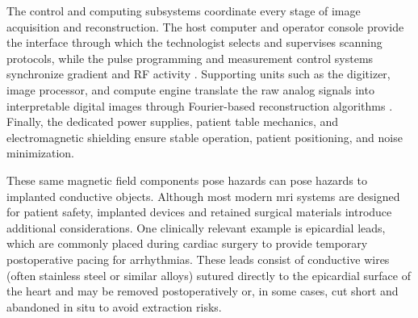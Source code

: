 The control and computing subsystems coordinate every stage of image acquisition and reconstruction. The host computer and operator console provide the interface through which the technologist selects and supervises scanning protocols, while the pulse programming and measurement control systems synchronize gradient and RF activity \cite{bushberg2011}. Supporting units such as the digitizer, image processor, and compute engine translate the raw analog signals into interpretable digital images through Fourier-based reconstruction algorithms \cite{Prince_MedicalImaging_2015}. Finally, the dedicated power supplies, patient table mechanics, and electromagnetic shielding ensure stable operation, patient positioning, and noise minimization. 

These same magnetic field components pose hazards can pose hazards to implanted conductive objects. Although most modern \gls{mri} systems are designed for patient safety, implanted devices and retained surgical materials introduce additional considerations. One clinically relevant example is epicardial leads, which are commonly placed during cardiac surgery to provide temporary postoperative pacing for arrhythmias. These leads consist of conductive wires (often stainless steel or similar alloys) sutured directly to the epicardial surface of the heart and may be removed postoperatively or, in some cases, cut short and abandoned in situ to avoid extraction risks.